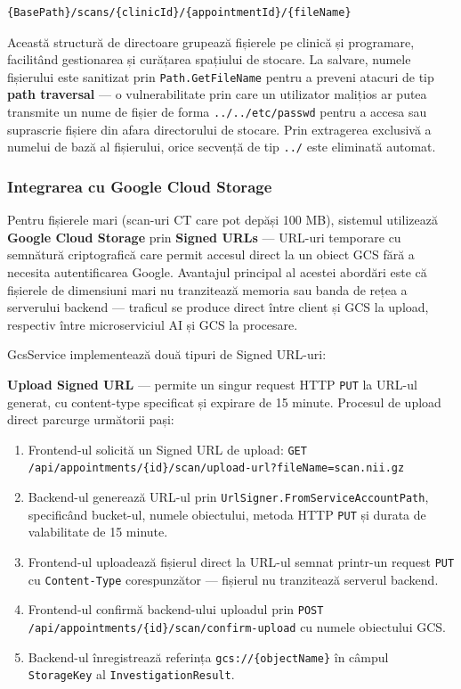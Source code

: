 \documentclass[12pt, a4paper]{report}
\begin{document}
\begin{verbatim}
{BasePath}/scans/{clinicId}/{appointmentId}/{fileName}
\end{verbatim}

Această structură de directoare grupează fișierele pe clinică și programare,
facilitând gestionarea și curățarea spațiului de stocare. La salvare, numele
fișierului este sanitizat prin \texttt{Path.GetFileName} pentru a preveni atacuri
de tip \textbf{path traversal} --- o vulnerabilitate prin care un utilizator
malițios ar putea transmite un nume de fișier de forma \texttt{../../etc/passwd}
pentru a accesa sau suprascrie fișiere din afara directorului de stocare.
Prin extragerea exclusivă a numelui de bază al fișierului, orice secvență de
tip \texttt{../} este eliminată automat.

\subsubsection{Integrarea cu Google Cloud Storage}

Pentru fișierele mari (scan-uri CT care pot depăși 100 MB), sistemul utilizează
\textbf{Google Cloud Storage} prin \textbf{Signed URLs} --- URL-uri temporare cu
semnătură criptografică care permit accesul direct la un obiect GCS fără a necesita
autentificarea Google. Avantajul principal al acestei abordări este că fișierele
de dimensiuni mari nu tranzitează memoria sau banda de rețea a serverului backend
--- traficul se produce direct între client și GCS la upload, respectiv între
microserviciul AI și GCS la procesare.

GcsService implementează două tipuri de Signed URL-uri:

\textbf{Upload Signed URL} --- permite un singur request HTTP \texttt{PUT} la
URL-ul generat, cu content-type specificat și expirare de 15 minute.
Procesul de upload direct parcurge următorii pași:

\begin{enumerate}
    \item Frontend-ul solicită un Signed URL de upload:
          \texttt{GET /api/appointments/\{id\}/scan/upload-url?fileName=scan.nii.gz}
    \item Backend-ul generează URL-ul prin \texttt{UrlSigner.FromServiceAccountPath},
          specificând bucket-ul, numele obiectului, metoda HTTP \texttt{PUT} și
          durata de valabilitate de 15 minute.
    \item Frontend-ul uploadează fișierul direct la URL-ul semnat printr-un request
          \texttt{PUT} cu \texttt{Content-Type} corespunzător --- fișierul nu
          tranzitează serverul backend.
    \item Frontend-ul confirmă backend-ului uploadul prin
          \texttt{POST /api/appointments/\{id\}/scan/confirm-upload} cu numele
          obiectului GCS.
    \item Backend-ul înregistrează referința \texttt{gcs://\{objectName\}} în
          câmpul \texttt{StorageKey} al \texttt{InvestigationResult}.
\end{enumerate}
\end{document}
